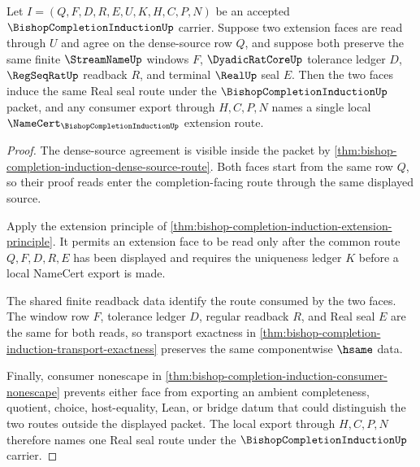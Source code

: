 \begin{theorem}
\label{thm:bishop-completion-induction-extension-uniqueness}
Let $I=(Q,F,D,R,E,U,K,H,C,P,N)$ be an accepted $\BishopCompletionInductionUp$ carrier. Suppose two extension faces are read through $U$ and agree on the dense-source row $Q$, and suppose both preserve the same finite $\StreamNameUp$ windows $F$, $\DyadicRatCoreUp$ tolerance ledger $D$, $\RegSeqRatUp$ readback $R$, and terminal $\RealUp$ seal $E$. Then the two faces induce the same Real seal route under the $\BishopCompletionInductionUp$ packet, and any consumer export through $H,C,P,N$ names a single local $\NameCert_{\BishopCompletionInductionUp}$ extension route.
\end{theorem}
\begin{proof}
The dense-source agreement is visible inside the packet by \autoref{thm:bishop-completion-induction-dense-source-route}. Both faces start from the same row $Q$, so their proof reads enter the completion-facing route through the same displayed source.

Apply the extension principle of \autoref{thm:bishop-completion-induction-extension-principle}. It permits an extension face to be read only after the common route $Q,F,D,R,E$ has been displayed and requires the uniqueness ledger $K$ before a local NameCert export is made.

The shared finite readback data identify the route consumed by the two faces. The window row $F$, tolerance ledger $D$, regular readback $R$, and Real seal $E$ are the same for both reads, so transport exactness in \autoref{thm:bishop-completion-induction-transport-exactness} preserves the same componentwise $\hsame$ data.

Finally, consumer nonescape in \autoref{thm:bishop-completion-induction-consumer-nonescape} prevents either face from exporting an ambient completeness, quotient, choice, host-equality, Lean, or bridge datum that could distinguish the two routes outside the displayed packet. The local export through $H,C,P,N$ therefore names one Real seal route under the $\BishopCompletionInductionUp$ carrier.
\end{proof}

